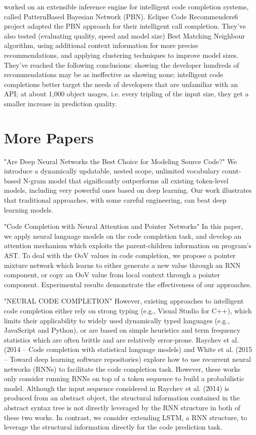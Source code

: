 \cite{Prok15a} worked on an extensible inference engine for intelligent code completion
systems, called PatternBased Bayesian Network (PBN). Eclipse Code Recommenders6 project adapted
the PBN approach for their intelligent call completion. They've also tested (evaluating quality,
speed and model size) Best Matching Neighbour algorithm, using additional context information
for more precise recommendations, and applying clustering techniques to improve model sizes.
They've reached the following conclusions: showing the developer hundreds of recommendations
may be as ineffective as showing none; intelligent code completions better target the needs of
developers that are unfamiliar with an API; at about 1,000 object usages, i.e. every tripling
of the input size, they get a smaller increase in prediction quality.

\section{More Papers}
"Are Deep Neural Networks the Best Choice for Modeling Source Code?"
We introduce a dynamically updatable, nested scope, unlimited vocabulary count-based
N-gram model that significantly outperforms all existing token-level models, including
very powerful ones based on deep learning. Our work illustrates that traditional
approaches, with some careful engineering, can beat deep learning models.

"Code Completion with Neural Attention and Pointer Networks"
In this paper, we apply neural language models on the code completion task, and
develop an attention mechanism which exploits the parent-children information on
program’s AST. To deal with the OoV values in code completion, we propose a pointer
mixture network which learns to either generate a new value through an RNN component,
or copy an OoV value from local context through a pointer component. Experimental
results demonstrate the effectiveness of our approaches.

"NEURAL CODE COMPLETION"
However, existing approaches to intelligent code completion either rely on strong typing
(e.g., Visual Studio for C++), which limits their applicability to widely used dynamically
typed languages (e.g., JavaScript and Python), or are based on simple heuristics and term
frequency statistics which are often brittle and are relatively error-prone.
Raychev et al. (2014 -- Code completion with statistical language models) and White et al.
(2015 -- Toward deep learning software repositories) explore how to use recurrent neural networks
(RNNs) to facilitate the code completion task. However, these works only consider running
RNNs on top of a token sequence to build a probabilistic model. Although the input sequence
considered in Raychev et al. (2014) is produced from an abstract object, the structural
information contained in the abstract syntax tree is not directly leveraged by the RNN structure
in both of these two works. In contrast, we consider extending LSTM, a RNN structure,
to leverage the structural information directly for the code prediction task.

